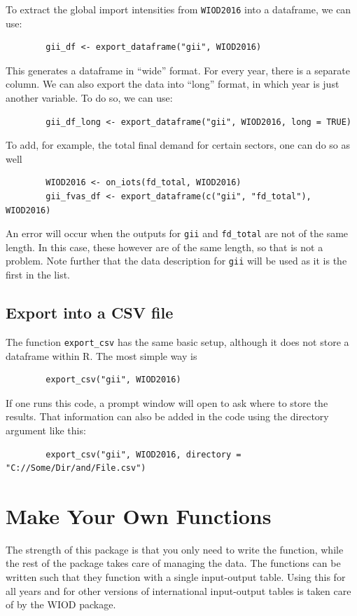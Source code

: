 \documentclass[10pt,a4paper]{paper}
\begin{document}
	To extract the global import intensities from \texttt{WIOD2016} into a dataframe, we can use:
	\begin{verbatim}
		gii_df <- export_dataframe("gii", WIOD2016)
	\end{verbatim}
	This generates a dataframe in ``wide'' format. For every year, there is a separate column. We can also export the data into ``long'' format, in which year is just another variable. To do so, we can use:
	\begin{verbatim}
		gii_df_long <- export_dataframe("gii", WIOD2016, long = TRUE)
	\end{verbatim}
	To add, for example, the total final demand for certain sectors, one can do so as well
	\begin{verbatim}
		WIOD2016 <- on_iots(fd_total, WIOD2016)
		gii_fvas_df <- export_dataframe(c("gii", "fd_total"), WIOD2016)
	\end{verbatim}	
	An error will occur when the outputs for \texttt{gii} and \texttt{fd\_total} are not of the same length. In this case, these however are of the same length, so that is not a problem. Note further that the data description for \texttt{gii} will be used as it is the first in the list.
	
	\subsection{Export into a CSV file}
	The function \texttt{export\_csv} has the same basic setup, although it does not store a dataframe within R. The most simple way is
	\begin{verbatim}
		export_csv("gii", WIOD2016)
	\end{verbatim}
	If one runs this code, a prompt window will open to ask where to store the results. That information can also be added in the code using the directory argument like this:
	\begin{verbatim}
		export_csv("gii", WIOD2016, directory = "C://Some/Dir/and/File.csv")
	\end{verbatim}
	\section{Make Your Own Functions}
	The strength of this package is that you only need to write the function, while the rest of the package takes care of managing the data. The functions can be written such that they function with a single input-output table. Using this for all years and for other versions of international input-output tables is taken care of by the WIOD package.
	
\end{document}
